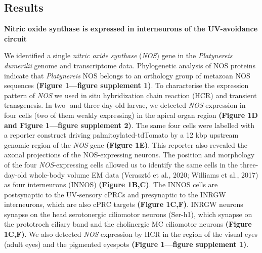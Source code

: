 \documentclass[
  10pt,
  onecolumn]{article}
\begin{document}
\hypertarget{results}{%
\subsection{Results}\label{results}}

\textbf{Nitric oxide synthase is expressed in interneurons of the
UV-avoidance circuit}

We identified a single \emph{nitric oxide synthase} (\emph{NOS}) gene in
the \emph{Platynereis dumerilii} genome and transcriptome data.
Phylogenetic analysis of NOS proteins indicate that \emph{Platynereis}
NOS belongs to an orthology group of metazoan NOS sequences
\textbf{(Figure 1---figure supplement 1)}. To characterise the
expression pattern of \emph{NOS} we used in situ hybridization chain
reaction (HCR) and transient transgenesis. In two- and three-day-old
larvae, we detected \emph{NOS} expression in four cells (two of them
weakly expressing) in the apical organ region \textbf{(Figure 1D and
Figure 1---figure supplement 2)}. The same four cells were labelled with
a reporter construct driving palmitoylated-tdTomato by a 12 kbp upstream
genomic region of the \emph{NOS} gene \textbf{(Figure 1E)}. This
reporter also revealed the axonal projections of the NOS-expressing
neurons. The position and morphology of the four \emph{NOS}-expressing
cells allowed us to identify the same cells in the three-day-old
whole-body volume EM data (Verasztó et al., 2020; Williams et al., 2017)
as four interneurons (INNOS) \textbf{(Figure 1B,C)}. The INNOS cells are
postsynaptic to the UV-sensory cPRCs and presynaptic to the INRGW
interneurons, which are also cPRC targets \textbf{(Figure 1C,F)}. INRGW
neurons synapse on the head serotonergic ciliomotor neurons (Ser-h1),
which synapse on the prototroch ciliary band and the cholinergic MC
ciliomotor neurons \textbf{(Figure 1C,F)}. We also detected \emph{NOS}
expression by HCR in the region of the visual eyes (adult eyes) and the
pigmented eyespots \textbf{(Figure 1---figure supplement 1)}.
\end{document}
